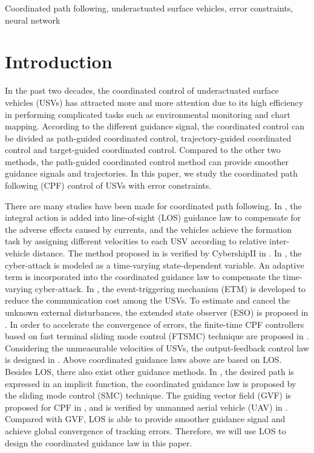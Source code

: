 \documentclass[conference,letterpaper,10.5pt]{IEEEtran}
\begin{document}
\begin{keywords}
Coordinated path following, underactuated surface vehicles, error constraints, neural network
\end{keywords}

\section{Introduction}

In the past two decades, the coordinated control of underactuated surface vehicles (USVs) has attracted more and more attention due to its high efficiency in performing complicated tasks such as environmental monitoring and chart mapping. According to the different guidance signal, the coordinated control can be divided as path-guided coordinated control, trajectory-guided coordinated control and target-guided coordinated control. Compared to the other two methods, the path-guided coordinated control method can provide smoother guidance signals and trajectories. In this paper, we study the coordinated path following (CPF) control of USVs with error constraints.

There are many studies have been made for coordinated path following. In \cite{bib1}, the integral action is added into line-of-sight (LOS) guidance law to compensate for the adverse effects caused by currents, and the vehicles achieve the formation task by assigning different velocities to each USV according to relative inter-vehicle distance. The method proposed in \cite{bib1} is verified by CybershipII in \cite{bib2}. In \cite{bib3}, the cyber-attack is modeled as a time-varying state-dependent variable. An adaptive term is incorporated into the coordinated guidance law to compensate the time-varying cyber-attack. In \cite{bib4}, the event-triggering mechanism (ETM) is developed to reduce the communication cost among the USVs.  To estimate and cancel the unknown external disturbances, the extended state observer (ESO) is proposed in \cite{bib5}. In order to accelerate the convergence of errors, the finite-time CPF controllers based on fast terminal sliding mode control (FTSMC) technique are proposed in \cite{bib6}. Considering the unmeasurable velocities of USVs, the output-feedback control law is designed in \cite{bib7}. Above coordinated guidance laws above are based on LOS. Besides LOS, there also exist other guidance methods. In \cite{bib8}, the desired path is expressed in an implicit function, the coordinated guidance law is proposed by the sliding mode control (SMC) technique. The guiding vector field (GVF) is proposed for CPF in \cite{bib9}, and is verified by unmanned aerial vehicle (UAV) in \cite{bib10}.  Compared with GVF, LOS is able to provide smoother guidance signal and achieve global convergence of tracking errors. Therefore, we will use LOS to design the coordinated guidance law in this paper. 
\end{document}
